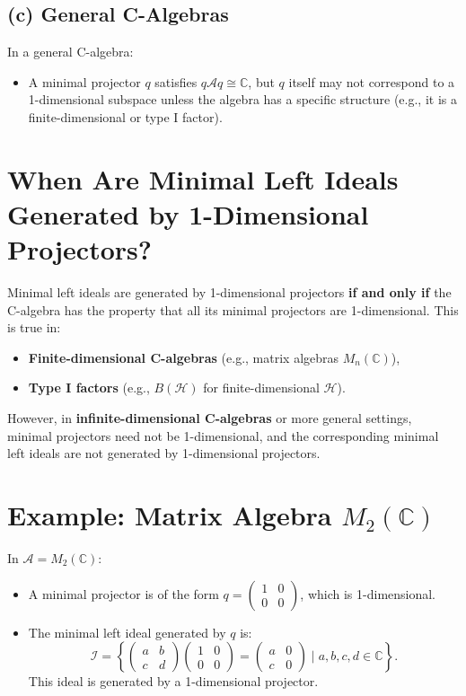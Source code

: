 \documentclass{article}
\begin{document}
\subsection*{(c) General C\*-Algebras}

In a general C\*-algebra:
\begin{itemize}
    \item A minimal projector \( q \) satisfies \( q \mathcal{A} q \cong \mathbb{C} \), but \( q \) itself may not correspond to a 1-dimensional subspace unless the algebra has a specific structure (e.g., it is a finite-dimensional or type I factor).
\end{itemize}

\section*{When Are Minimal Left Ideals Generated by 1-Dimensional Projectors?}

Minimal left ideals are generated by 1-dimensional projectors \textbf{if and only if} the C\*-algebra has the property that all its minimal projectors are 1-dimensional. This is true in:
\begin{itemize}
    \item \textbf{Finite-dimensional C\*-algebras} (e.g., matrix algebras \( M_n(\mathbb{C}) \)),
    \item \textbf{Type I factors} (e.g., \( B(\mathcal{H}) \) for finite-dimensional \( \mathcal{H} \)).
\end{itemize}

However, in \textbf{infinite-dimensional C\*-algebras} or more general settings, minimal projectors need not be 1-dimensional, and the corresponding minimal left ideals are not generated by 1-dimensional projectors.

\section*{Example: Matrix Algebra \( M_2(\mathbb{C}) \)}

In \( \mathcal{A} = M_2(\mathbb{C}) \):
\begin{itemize}
    \item A minimal projector is of the form \( q = \begin{pmatrix} 1 & 0 \\ 0 & 0 \end{pmatrix} \), which is 1-dimensional.
    \item The minimal left ideal generated by \( q \) is:
    \[
    \mathcal{I} = \left\{ \begin{pmatrix} a & b \\ c & d \end{pmatrix} \begin{pmatrix} 1 & 0 \\ 0 & 0 \end{pmatrix} = \begin{pmatrix} a & 0 \\ c & 0 \end{pmatrix} \mid a, b, c, d \in \mathbb{C} \right\}.
    \]
    This ideal is generated by a 1-dimensional projector.
\end{itemize}
\end{document}
